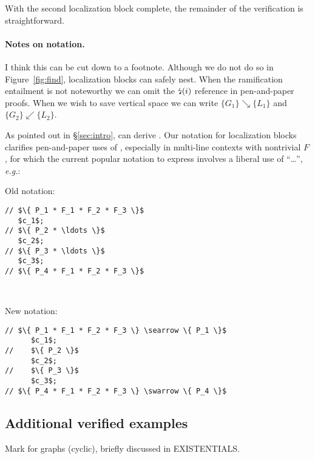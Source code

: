 With the second localization block complete, the remainder of the verification is straightforward.

\paragraph{Notes on notation.} 

{\color{magenta} I think this can be cut down to a footnote.} Although we do not do so in Figure~\ref{fig:find}, localization blocks can safely nest.  When the ramification entailment is not noteworthy we can omit the $\mbox{\lightning}(i)$ reference in pen-and-paper proofs.  When we wish to save vertical space we can write $\{ G_1 \} \searrow \{ L_1 \}$ and $\{ G_2 \} \swarrow \{ L_2 \}$.

As pointed out in \S\ref{sec:intro},  can derive .  Our notation for localization blocks clarifies pen-and-paper uses of , especially in multi-line contexts with nontrivial $F$, for which the current popular notation to express  involves a liberal use of ``\ldots'', \emph{e.g.}:

\vspace{5pt}

\begin{minipage}{.19\textwidth}
Old notation:
\begin{lstlisting}
// $\{ P_1 * F_1 * F_2 * F_3 \}$
   $c_1$;
// $\{ P_2 * \ldots \}$
   $c_2$;
// $\{ P_3 * \ldots \}$
   $c_3$;
// $\{ P_4 * F_1 * F_2 * F_3 \}$
\end{lstlisting}
\end{minipage} \vline ~~~
\begin{minipage}{.2\textwidth}
New notation:
\begin{lstlisting}[numbers=none]
// $\{ P_1 * F_1 * F_2 * F_3 \} \searrow \{ P_1 \}$
      $c_1$;
//    $\{ P_2 \}$
      $c_2$;
//    $\{ P_3 \}$
      $c_3$;
// $\{ P_4 * F_1 * F_2 * F_3 \} \swarrow \{ P_4 \}$
\end{lstlisting}
\end{minipage}
\vspace{-0.75ex}

\subsection{Additional verified examples}
\label{sec:application}

Mark for graphs (cyclic), briefly discussed in EXISTENTIALS.

